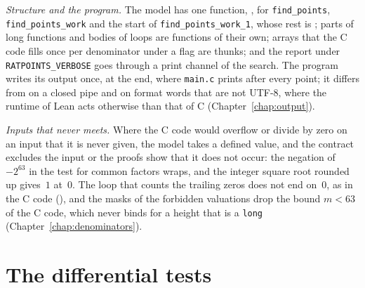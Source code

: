 \emph{Structure and the program.} The model has one function, ,
for \verb|find_points|, \verb|find_points_work| and the start of \verb|find_points_work_1|, whose
rest is ; parts of long functions and bodies of loops are functions
of their own; arrays that the C code fills once per denominator under a flag are thunks; and the
report under \verb|RATPOINTS_VERBOSE| goes through a print channel of the search. The program writes
its output once, at the end, where \verb|main.c| prints after every point; it differs from \ratpoints{}
on a closed pipe and on format words that are not UTF-8, where the runtime of Lean acts otherwise
than that of C (Chapter~\ref{chap:output}).

\emph{Inputs that \ratpoints{} never meets.} Where the C code would overflow or divide by zero on an
input that it is never given, the model takes a defined value, and the contract excludes the input
or the proofs show that it does not occur: the negation of~$-2^{63}$ in the test for common factors
wraps, and the integer square root rounded up gives~$1$ at~$0$. The loop that counts the trailing
zeros does not end on~$0$, as in the C code (), and the masks of the
forbidden valuations drop the bound $m < 63$ of the C code, which never binds for a height that is a
\verb|long| (Chapter~\ref{chap:denominators}).

\section{The differential tests}\label{sec:ccodeTests}

